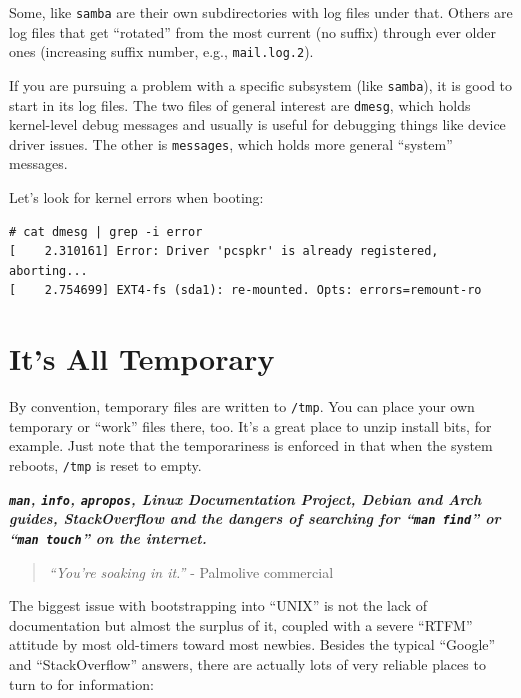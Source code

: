 \documentclass[10pt,]{book}
\numberwithin{figure}{chapter}
\begin{document}
Some, like \texttt{samba} are their own subdirectories with log files
under that. Others are log files that get ``rotated'' from the most
current (no suffix) through ever older ones (increasing suffix number,
e.g., \texttt{mail.log.2}).

If you are pursuing a problem with a specific subsystem (like
\texttt{samba}), it is good to start in its log files. The two files of
general interest are \texttt{dmesg}, which holds kernel-level debug
messages and usually is useful for debugging things like device driver
issues. The other is \texttt{messages}, which holds more general
``system'' messages.

Let's look for kernel errors when booting:

\begin{verbatim}
# cat dmesg | grep -i error
[    2.310161] Error: Driver 'pcspkr' is already registered, aborting...
[    2.754699] EXT4-fs (sda1): re-mounted. Opts: errors=remount-ro
\end{verbatim}

\section{It's All Temporary}\label{its-all-temporary}

By convention, temporary files are written to \texttt{/tmp}. You can
place your own temporary or ``work'' files there, too. It's a great
place to unzip install bits, for example. Just note that the
temporariness is enforced in that when the system reboots, \texttt{/tmp}
is reset to empty.


\textbf{\emph{\texttt{man}, \texttt{info}, \texttt{apropos}, Linux
Documentation Project, Debian and Arch guides, StackOverflow and the
dangers of searching for ``\texttt{man find}'' or ``\texttt{man touch}''
on the internet.}}

\begin{quote}
\emph{``You're soaking in it.''} - Palmolive commercial
\end{quote}

The biggest issue with bootstrapping into ``UNIX'' is not the lack of
documentation but almost the surplus of it, coupled with a severe
``RTFM'' attitude by most old-timers toward most newbies. Besides the
typical ``Google'' and ``StackOverflow'' answers, there are actually
lots of very reliable places to turn to for information:
\end{document}

